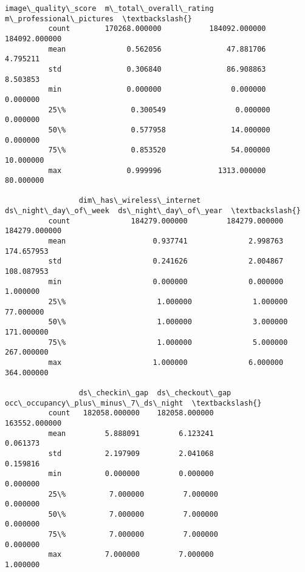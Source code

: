 \documentclass[11pt]{article}
\begin{document}
\begin{Verbatim}[commandchars=\\\{\}]
                 image\_quality\_score  m\_total\_overall\_rating  m\_professional\_pictures  \textbackslash{}
          count        170268.000000           184092.000000            184092.000000   
          mean              0.562056               47.881706                 4.795211   
          std               0.306840               86.908863                 8.503853   
          min               0.000000                0.000000                 0.000000   
          25\%               0.300549                0.000000                 0.000000   
          50\%               0.577958               14.000000                 0.000000   
          75\%               0.853520               54.000000                10.000000   
          max               0.999996             1313.000000                80.000000   
          
                 dim\_has\_wireless\_internet  ds\_night\_day\_of\_week  ds\_night\_day\_of\_year  \textbackslash{}
          count              184279.000000         184279.000000         184279.000000   
          mean                    0.937741              2.998763            174.657953   
          std                     0.241626              2.004867            108.087953   
          min                     0.000000              0.000000              1.000000   
          25\%                     1.000000              1.000000             77.000000   
          50\%                     1.000000              3.000000            171.000000   
          75\%                     1.000000              5.000000            267.000000   
          max                     1.000000              6.000000            364.000000   
          
                 ds\_checkin\_gap  ds\_checkout\_gap  occ\_occupancy\_plus\_minus\_7\_ds\_night  \textbackslash{}
          count   182058.000000    182058.000000                        163552.000000   
          mean         5.888091         6.123241                             0.061373   
          std          2.197909         2.041068                             0.159816   
          min          0.000000         0.000000                             0.000000   
          25\%          7.000000         7.000000                             0.000000   
          50\%          7.000000         7.000000                             0.000000   
          75\%          7.000000         7.000000                             0.000000   
          max          7.000000         7.000000                             1.000000   
          

\end{Verbatim}
\end{document}
